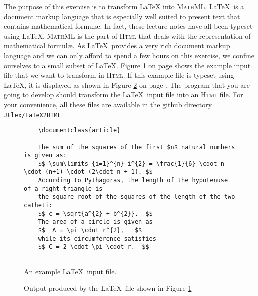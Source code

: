 \exerciseEng
The purpose of this exercise is to transform \href{http://www.latex-project.org}{\LaTeX} into 
\href{http://rypress.com/tutorials/mathml}{\textsc{MathML}}.  \LaTeX\ is a document markup language
that is especially well suited to present text that contains mathematical formul\ae.  In fact, these
lecture notes have all been typeset using \LaTeX.  \textsc{MathML} is the part of \textsc{Html} that
deals with the representation of mathematical formul\ae.  As \LaTeX\ provides a very rich
document markup language and we can only afford to spend a few hours on this exercise, we confine
ourselves to a small subset of \LaTeX.  Figure \ref{fig:input.tex} on page \pageref{fig:input.tex}
shows the example input file that we want to transform in \textsc{Html}.  If this example file is
typeset using \LaTeX, it is displayed as shown in Figure \ref{fig:input.pdf} on page
\pageref{fig:input.pdf}.  The program that you are
going to develop should transform the \LaTeX\ input file into an \textsc{Html} file.  For your
convenience, all these files are available in the github directory 
\\[0.2cm]
\hspace*{1.3cm}
\href{https://github.com/karlstroetmann/Formal-Languages/tree/master/JFlex/LaTeX2HTML}{\texttt{JFlex/LaTeX2HTML}}.

\begin{figure}[!ht]
  \centering
\begin{verbatim}
    \documentclass{article}
    
    The sum of the squares of the first $n$ natural numbers is given as:
    $$ \sum\limits_{i=1}^{n} i^{2} = \frac{1}{6} \cdot n \cdot (n+1) \cdot (2\cdot n + 1). $$
    According to Pythagoras, the length of the hypotenuse of a right triangle is
    the square root of the squares of the length of the two catheti:
    $$ c = \sqrt{a^{2} + b^{2}}.  $$
    The area of a circle is given as 
    $$  A = \pi \cdot r^{2},   $$ 
    while its circumference satisfies
    $$ C = 2 \cdot \pi \cdot r.  $$
    
    \end{verbatim}
  \caption{An example \LaTeX\ input file.}
  \label{fig:input.tex}
\end{figure}

\begin{figure}[!ht]
  \centering
  \caption{Output produced by the \LaTeX\ file shown in Figure \ref{fig:input.tex}}
  \label{fig:input.pdf}
\end{figure}

